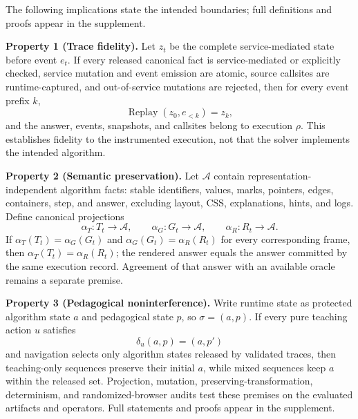 \documentclass[letterpaper]{article}
\begin{document}
The following implications state the intended boundaries; full
definitions and proofs appear in the supplement.

\smallskip\noindent
\textbf{Property 1 (Trace fidelity).}
Let \(z_t\) be the complete service-mediated state before event \(e_t\).
If every released canonical fact is service-mediated or explicitly
checked, service mutation and event emission are atomic, source
callsites are runtime-captured, and out-of-service mutations are
rejected, then for
every event prefix \(k\),
\[
\operatorname{Replay}(z_0,e_{<k})=z_k,
\]
and the answer, events, snapshots, and callsites belong to execution
\(\rho\). This establishes fidelity to the instrumented execution, not
that the solver implements the intended algorithm.

\smallskip\noindent
\textbf{Property 2 (Semantic preservation).}
Let \(\mathcal A\) contain representation-independent algorithm facts:
stable identifiers, values, marks, pointers, edges, containers, step,
and answer, excluding layout, CSS, explanations, hints, and logs.
Define canonical projections
\[
\alpha_T:T_t\!\to\!\mathcal A,\qquad
\alpha_G:G_t\!\to\!\mathcal A,\qquad
\alpha_R:R_t\!\to\!\mathcal A.
\]
If \(\alpha_T(T_t)=\alpha_G(G_t)\) and
\(\alpha_G(G_t)=\alpha_R(R_t)\) for every corresponding frame, then
\(\alpha_T(T_t)=\alpha_R(R_t)\); the rendered answer equals the answer
committed by the same execution record. Agreement of that answer with
an available oracle remains a separate premise.

\smallskip\noindent
\textbf{Property 3 (Pedagogical noninterference).}
Write runtime state as protected algorithm state \(a\) and pedagogical
state \(p\), so \(\sigma=(a,p)\). If every pure teaching action \(u\)
satisfies
\[
\delta_u(a,p)=(a,p')
\]
and navigation selects only algorithm states released by validated
traces, then teaching-only sequences preserve their initial \(a\),
while mixed sequences keep \(a\) within the released set. Projection,
mutation, preserving-transformation, determinism, and
randomized-browser audits test these premises on the evaluated artifacts
and operators. Full statements and proofs appear in the supplement.
\end{document}
